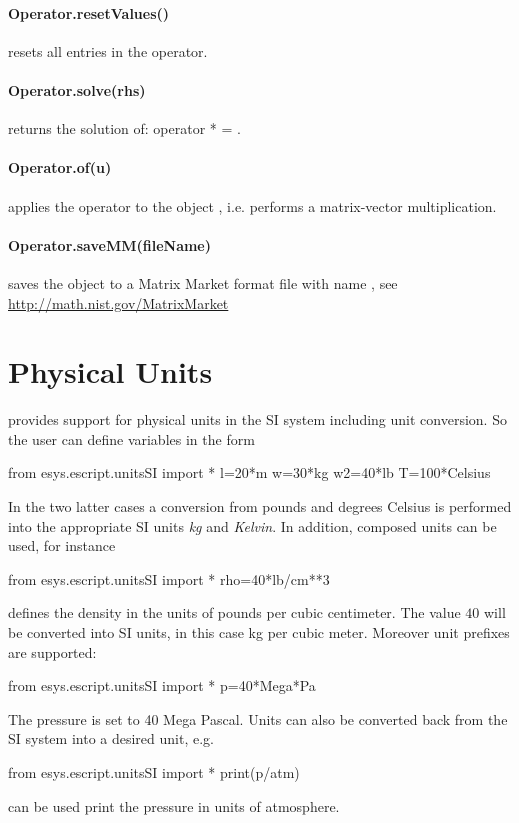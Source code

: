\paragraph{Operator.resetValues()}
resets all entries in the operator.


\paragraph{Operator.solve(rhs)}
returns the solution  of: operator *  = .


\paragraph{Operator.of(u)}
applies the operator to the \Data object , i.e. performs a matrix-vector
multiplication.


\paragraph{Operator.saveMM(fileName)}
saves the object to a Matrix Market format file with name , see
\url{http://math.nist.gov/MatrixMarket}


\section{Physical Units}
\escript provides support for physical units in the SI system
including unit conversion. So the user can define variables in the form
\begin{python}
  from esys.escript.unitsSI import *
  l=20*m
  w=30*kg
  w2=40*lb
  T=100*Celsius
\end{python}
In the two latter cases a conversion from pounds and degrees
Celsius is performed into the appropriate SI units \emph{kg}
and \emph{Kelvin}.
In addition, composed units can be used, for instance
\begin{python}
  from esys.escript.unitsSI import *
  rho=40*lb/cm**3
\end{python}
defines the density in the units of pounds per cubic centimeter.
The value $40$ will be converted into SI units, in this case kg per cubic
meter. Moreover unit prefixes are supported:
\begin{python}
  from esys.escript.unitsSI import *
  p=40*Mega*Pa
\end{python}
The pressure  is set to 40 Mega Pascal. Units can also be converted
back from the SI system into a desired unit, e.g.
\begin{python}
  from esys.escript.unitsSI import *
  print(p/atm)
\end{python}
can be used print the pressure in units of atmosphere.

